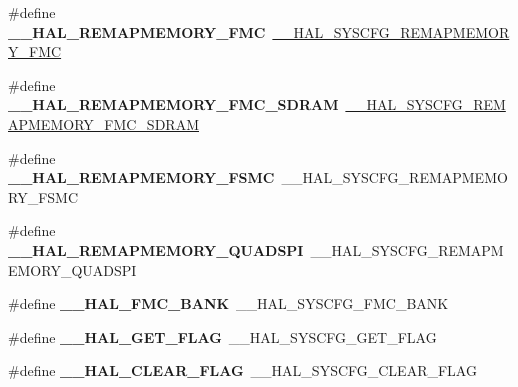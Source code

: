 \begin{DoxyCompactItemize}
\#define {\bfseries \+\_\+\+\_\+\+H\+A\+L\+\_\+\+R\+E\+M\+A\+P\+M\+E\+M\+O\+R\+Y\+\_\+\+F\+MC}~\mbox{\hyperlink{group___h_a_l___exported___macros_ga911da0daaaa54611ad5cc53b909836ee}{\+\_\+\+\_\+\+H\+A\+L\+\_\+\+S\+Y\+S\+C\+F\+G\+\_\+\+R\+E\+M\+A\+P\+M\+E\+M\+O\+R\+Y\+\_\+\+F\+MC}}
\item 
\mbox{\label{group___h_a_l___aliased___macros_ga366da658d4d21e3b2192803ffc1a15f9}} 
\#define {\bfseries \+\_\+\+\_\+\+H\+A\+L\+\_\+\+R\+E\+M\+A\+P\+M\+E\+M\+O\+R\+Y\+\_\+\+F\+M\+C\+\_\+\+S\+D\+R\+AM}~\mbox{\hyperlink{group___h_a_l___exported___macros_ga9289478fb2dc47d4cce6e0c956b4dafd}{\+\_\+\+\_\+\+H\+A\+L\+\_\+\+S\+Y\+S\+C\+F\+G\+\_\+\+R\+E\+M\+A\+P\+M\+E\+M\+O\+R\+Y\+\_\+\+F\+M\+C\+\_\+\+S\+D\+R\+AM}}
\item 
\mbox{\label{group___h_a_l___aliased___macros_gace8e26327633559ff2a31f3abfb0b43b}} 
\#define {\bfseries \+\_\+\+\_\+\+H\+A\+L\+\_\+\+R\+E\+M\+A\+P\+M\+E\+M\+O\+R\+Y\+\_\+\+F\+S\+MC}~\+\_\+\+\_\+\+H\+A\+L\+\_\+\+S\+Y\+S\+C\+F\+G\+\_\+\+R\+E\+M\+A\+P\+M\+E\+M\+O\+R\+Y\+\_\+\+F\+S\+MC
\item 
\mbox{\label{group___h_a_l___aliased___macros_gabec43ae4c792da49cd660bba7bf21133}} 
\#define {\bfseries \+\_\+\+\_\+\+H\+A\+L\+\_\+\+R\+E\+M\+A\+P\+M\+E\+M\+O\+R\+Y\+\_\+\+Q\+U\+A\+D\+S\+PI}~\+\_\+\+\_\+\+H\+A\+L\+\_\+\+S\+Y\+S\+C\+F\+G\+\_\+\+R\+E\+M\+A\+P\+M\+E\+M\+O\+R\+Y\+\_\+\+Q\+U\+A\+D\+S\+PI
\item 
\mbox{\label{group___h_a_l___aliased___macros_ga998ba343dd714de7bc84010ef1af5f89}} 
\#define {\bfseries \+\_\+\+\_\+\+H\+A\+L\+\_\+\+F\+M\+C\+\_\+\+B\+A\+NK}~\+\_\+\+\_\+\+H\+A\+L\+\_\+\+S\+Y\+S\+C\+F\+G\+\_\+\+F\+M\+C\+\_\+\+B\+A\+NK
\item 
\mbox{\label{group___h_a_l___aliased___macros_gabf8f11b57435bd1462f9a2137653c787}} 
\#define {\bfseries \+\_\+\+\_\+\+H\+A\+L\+\_\+\+G\+E\+T\+\_\+\+F\+L\+AG}~\+\_\+\+\_\+\+H\+A\+L\+\_\+\+S\+Y\+S\+C\+F\+G\+\_\+\+G\+E\+T\+\_\+\+F\+L\+AG
\item 
\mbox{\label{group___h_a_l___aliased___macros_ga5c6118ac714daf269dfcf8b0dc5740cf}} 
\#define {\bfseries \+\_\+\+\_\+\+H\+A\+L\+\_\+\+C\+L\+E\+A\+R\+\_\+\+F\+L\+AG}~\+\_\+\+\_\+\+H\+A\+L\+\_\+\+S\+Y\+S\+C\+F\+G\+\_\+\+C\+L\+E\+A\+R\+\_\+\+F\+L\+AG

\end{DoxyCompactItemize}
